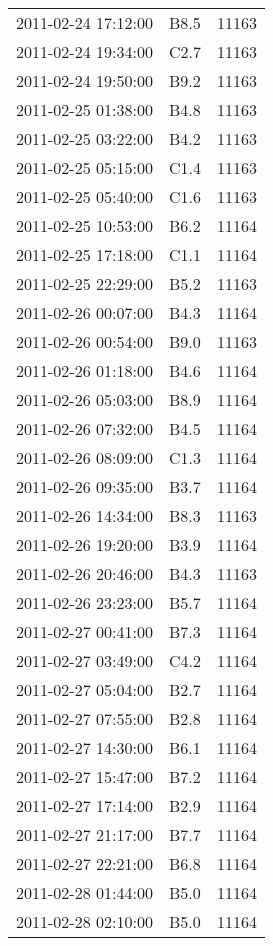 \documentclass{article}
\begin{document}
\begin{table}
\begin{tabular}{c|c|c}
			2011-02-24 17:12:00 & B8.5 & 11163 \\ 
			2011-02-24 19:34:00 & C2.7 & 11163 \\ 
			2011-02-24 19:50:00 & B9.2 & 11163 \\ 
			2011-02-25 01:38:00 & B4.8 & 11163 \\ 
			2011-02-25 03:22:00 & B4.2 & 11163 \\ 
			2011-02-25 05:15:00 & C1.4 & 11163 \\ 
			2011-02-25 05:40:00 & C1.6 & 11163 \\ 
			2011-02-25 10:53:00 & B6.2 & 11164 \\ 
			2011-02-25 17:18:00 & C1.1 & 11164 \\ 
			2011-02-25 22:29:00 & B5.2 & 11163 \\ 
			2011-02-26 00:07:00 & B4.3 & 11164 \\ 
			2011-02-26 00:54:00 & B9.0 & 11163 \\ 
			2011-02-26 01:18:00 & B4.6 & 11164 \\ 
			2011-02-26 05:03:00 & B8.9 & 11164 \\ 
			2011-02-26 07:32:00 & B4.5 & 11164 \\ 
			2011-02-26 08:09:00 & C1.3 & 11164 \\ 
			2011-02-26 09:35:00 & B3.7 & 11164 \\ 
			2011-02-26 14:34:00 & B8.3 & 11163 \\ 
			2011-02-26 19:20:00 & B3.9 & 11164 \\ 
			2011-02-26 20:46:00 & B4.3 & 11163 \\ 
			2011-02-26 23:23:00 & B5.7 & 11164 \\ 
			2011-02-27 00:41:00 & B7.3 & 11164 \\ 
			2011-02-27 03:49:00 & C4.2 & 11164 \\ 
			2011-02-27 05:04:00 & B2.7 & 11164 \\ 
			2011-02-27 07:55:00 & B2.8 & 11164 \\ 
			2011-02-27 14:30:00 & B6.1 & 11164 \\ 
			2011-02-27 15:47:00 & B7.2 & 11164 \\ 
			2011-02-27 17:14:00 & B2.9 & 11164 \\ 
			2011-02-27 21:17:00 & B7.7 & 11164 \\ 
			2011-02-27 22:21:00 & B6.8 & 11164 \\ 
			2011-02-28 01:44:00 & B5.0 & 11164 \\ 
			2011-02-28 02:10:00 & B5.0 & 11164 \\ 

\end{tabular}
\end{table}
\end{document}
